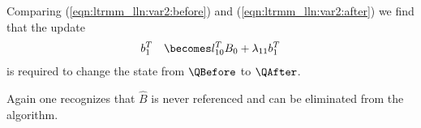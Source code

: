 Comparing 
(\ref{eqn:ltrmm_lln:var2:before}) and
(\ref{eqn:ltrmm_lln:var2:after})
we find that the update
\begin{eqnarray*}
& b_1^T & \becomes l_{10}^T B_{0} + \lambda_{11} b_1^T 
\end{eqnarray*}
is required to change the state from $ \QBefore $
to $ \QAfter $.


Again one recognizes that $ \hat{B} $ is never
referenced and can be eliminated from the algorithm.


\renewcommand{\invariant}{
\FlaTwoByOne{ B_T}{B_B} =
\FlaTwoByOne{ \hat{B}_T }
            { L_{BL} \hat{B}_T + L_{BR} \hat{B}_B }
\wedge
\ldots
}

\renewcommand{\guard}{ \neg \SameSize( L, L_{BR} ) }

\renewcommand{\partitionings}{
$ 
B \rightarrow \FlaTwoByOne{ B_{T} }
                          { B_{B} }
$,
$ 
\hat{B} \rightarrow \FlaTwoByOne{ \hat{B}_{T} }
                          { \hat{B}_{B} }
$, and
$ 
L \rightarrow \FlaTwoByTwo{ L_{TL} }{ 0 }
                          { L_{BL} }{ L_{BR} }
$
}
\renewcommand{\partitionsizes}{
$ B_{B} $ and $ \hat{ B }_B $ have $ 0 $ rows
and $ L_{BR} $ is $ 0 \times 0 $
}

\renewcommand{\repartitionings}{
$ 
\FlaTwoByOne{ B_T }{ B_B } 
\rightarrow
\FlaThreeByOneT{ B_0 }{ b_1^T }{ B_2 },
\FlaTwoByOne{ \hat{B}_T }{ \hat{B}_B } 
\rightarrow
\FlaThreeByOneT{ \hat{B}_0 }{ \hat{b}_1^T }{ \hat{B}_2 },
$ \\
and
$ \FlaTwoByTwo{ L_{TL} }{ 0 }
            { L_{BL} }{ L_{BR} }
\rightarrow
\FlaThreeByThreeTL{ L_{00} }{ 0 }{ 0 }
                { l_{10}^T }{ \lambda_{11} }{ 0 }
                { L_{20} }{ l_{21} }{ L_{22} }
$
}
\renewcommand{\repartitionsizes}{
$ b_1^T $ and $ \hat{b}_1^T $ are rows 
and $ \lambda_{11} $ is a scalar
}

\renewcommand{\moveboundaries}{%
$ 
\FlaTwoByOne{ B_T }{ B_B } 
\leftarrow
\FlaThreeByOneB{ B_0 }{ b_1^T }{ B_2 },
\FlaTwoByOne{ \hat{B}_T }{ \hat{B}_B } 
\leftarrow
\FlaThreeByOneB{ \hat{B}_0 }{ \hat{b}_1^T }{ \hat{B}_2 },
$ \\
and
$ \FlaTwoByTwo{ L_{TL} }{ 0 }
            { L_{BL} }{ L_{BR} }
\leftarrow
\FlaThreeByThreeBR{ L_{00} }{ 0 }{ 0 }
                { l_{10}^T }{ \lambda_{11} }{ 0 }
                { L_{20} }{ l_{21} }{ L_{22} }
$
}

\renewcommand{\beforeupdate}{
\FlaTwoByOne{ 
\FlaTwoByOneSingleLine{ B_0 }{ b_1^T }
}
{
B_2
} =
\FlaTwoByOne{ 
\FlaTwoByOneSingleLine{ \hat{B}_0 }{ \hat{b}_1^T }
}
{
\FlaOneByTwoSingleLine{ L_{20} }{ l_{21} }
\FlaTwoByOneSingleLine{ \hat{B}_0 }{ \hat{b}_1^T } +
L_{22} \hat{B}_2 
}
\wedge \ldots
}

